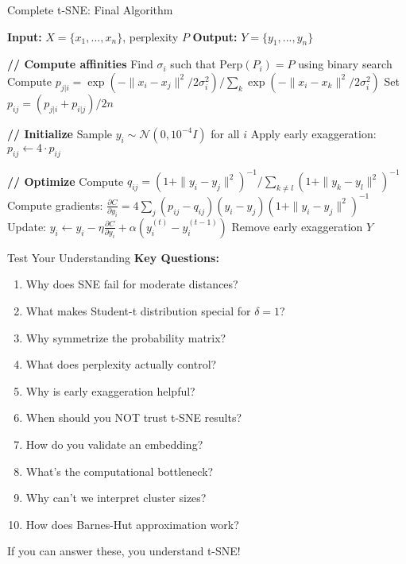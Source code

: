 \documentclass[aspectratio=169]{beamer}
\begin{document}
\begin{frame}{Complete t-SNE: Final Algorithm}
\small
\begin{algorithmic}[1]
\State \textbf{Input:} $X = \{x_1, ..., x_n\}$, perplexity $P$
\State \textbf{Output:} $Y = \{y_1, ..., y_n\}$

\State \textbf{// Compute affinities}
    \State Find $\sigma_i$ such that $\text{Perp}(P_i) = P$ using binary search
    \State Compute $p_{j|i} = \exp(-\|x_i - x_j\|^2/2\sigma_i^2) / \sum_k \exp(-\|x_i - x_k\|^2/2\sigma_i^2)$
\EndFor
\State Set $p_{ij} = (p_{j|i} + p_{i|j})/2n$

\State \textbf{// Initialize}
\State Sample $y_i \sim \mathcal{N}(0, 10^{-4}I)$ for all $i$
\State Apply early exaggeration: $p_{ij} \leftarrow 4 \cdot p_{ij}$

\State \textbf{// Optimize}
    \State Compute $q_{ij} = (1 + \|y_i - y_j\|^2)^{-1} / \sum_{k \neq l}(1 + \|y_k - y_l\|^2)^{-1}$
    \State Compute gradients: $\frac{\partial C}{\partial y_i} = 4\sum_j (p_{ij} - q_{ij})(y_i - y_j)(1 + \|y_i - y_j\|^2)^{-1}$
    \State Update: $y_i \leftarrow y_i - \eta\frac{\partial C}{\partial y_i} + \alpha(y_i^{(t)} - y_i^{(t-1)})$
     Remove early exaggeration \EndIf
\EndFor
\State \Return $Y$
\end{algorithmic}
\end{frame}

\begin{frame}{Test Your Understanding}
\textbf{Key Questions:}

\begin{enumerate}
\item Why does SNE fail for moderate distances?
\item What makes Student-t distribution special for $\delta = 1$?
\item Why symmetrize the probability matrix?
\item What does perplexity actually control?
\item Why is early exaggeration helpful?
\item When should you NOT trust t-SNE results?
\item How do you validate an embedding?
\item What's the computational bottleneck?
\item Why can't we interpret cluster sizes?
\item How does Barnes-Hut approximation work?
\end{enumerate}

\vspace{0.3cm}
\begin{center}
\colorbox{yellow!30}{If you can answer these, you understand t-SNE!}
\end{center}
\end{frame}
\end{document}
